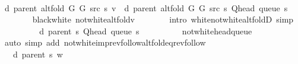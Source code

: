 \begin{isabellebody}
\isanewline
\ \ \ \ \isamarkupfalse%
\ {\isachardoublequoteopen}d\ {\isacharparenleft}{\kern0pt}parent\ {\isacharparenleft}{\kern0pt}alt{\isacharunderscore}{\kern0pt}fold\ G{}\ G{}\ src\ s{\isacharparenright}{\kern0pt}{\isacharparenright}{\kern0pt}\ v\ {\isacharequal}{\kern0pt}\ d\ {\isacharparenleft}{\kern0pt}parent\ {\isacharparenleft}{\kern0pt}alt{\isacharunderscore}{\kern0pt}fold\ G{}\ G{}\ src\ s{\isacharparenright}{\kern0pt}{\isacharparenright}{\kern0pt}\ {\isacharparenleft}{\kern0pt}Q{\isacharunderscore}{\kern0pt}head\ {\isacharparenleft}{\kern0pt}queue\ s{\isacharparenright}{\kern0pt}{\isacharparenright}{\kern0pt}\ {\isacharplus}{\kern0pt}\ {}{\isachardoublequoteclose}\isanewline
\ \ \ \ \ \ \isamarkupfalse%
\ black{\isacharunderscore}{\kern0pt}white\ not{\isacharunderscore}{\kern0pt}white{\isacharunderscore}{\kern0pt}alt{\isacharunderscore}{\kern0pt}fold{\isacharunderscore}{\kern0pt}v\isanewline
\ \ \ \ \ \ \isamarkupfalse%
\ {\isacharparenleft}{\kern0pt}intro\ white{\isacharunderscore}{\kern0pt}not{\isacharunderscore}{\kern0pt}white{\isacharunderscore}{\kern0pt}alt{\isacharunderscore}{\kern0pt}foldD{\isacharunderscore}{\kern0pt}{}{\isacharparenright}{\kern0pt}\ simp\isanewline
\ \ \ \ \isamarkupfalse%
\ \isamarkupfalse%
\ {\isachardoublequoteopen}{\isachardot}{\kern0pt}{\isachardot}{\kern0pt}{\isachardot}{\kern0pt}\ {\isacharequal}{\kern0pt}\ d\ {\isacharparenleft}{\kern0pt}parent\ s{\isacharparenright}{\kern0pt}\ {\isacharparenleft}{\kern0pt}Q{\isacharunderscore}{\kern0pt}head\ {\isacharparenleft}{\kern0pt}queue\ s{\isacharparenright}{\kern0pt}{\isacharparenright}{\kern0pt}\ {\isacharplus}{\kern0pt}\ {}{\isachardoublequoteclose}\isanewline
\ \ \ \ \ \ \isamarkupfalse%
\ not{\isacharunderscore}{\kern0pt}white{\isacharunderscore}{\kern0pt}head{\isacharunderscore}{\kern0pt}queue\isanewline
\ \ \ \ \ \ \isamarkupfalse%
\ {\isacharparenleft}{\kern0pt}auto\ simp\ add{\isacharcolon}{\kern0pt}\ not{\isacharunderscore}{\kern0pt}white{\isacharunderscore}{\kern0pt}imp{\isacharunderscore}{\kern0pt}rev{\isacharunderscore}{\kern0pt}follow{\isacharunderscore}{\kern0pt}alt{\isacharunderscore}{\kern0pt}fold{\isacharunderscore}{\kern0pt}eq{\isacharunderscore}{\kern0pt}rev{\isacharunderscore}{\kern0pt}follow{\isacharparenright}{\kern0pt}\isanewline
\ \ \ \ \isamarkupfalse%
\ \isamarkupfalse%
\ {\isachardoublequoteopen}{\isachardot}{\kern0pt}{\isachardot}{\kern0pt}{\isachardot}{\kern0pt}\ {\isasymle}\ d\ {\isacharparenleft}{\kern0pt}parent\ s{\isacharparenright}{\kern0pt}\ w\ {\isacharplus}{\kern0pt}\ {}{\isachardoublequoteclose}\isanewline

\end{isabellebody}
